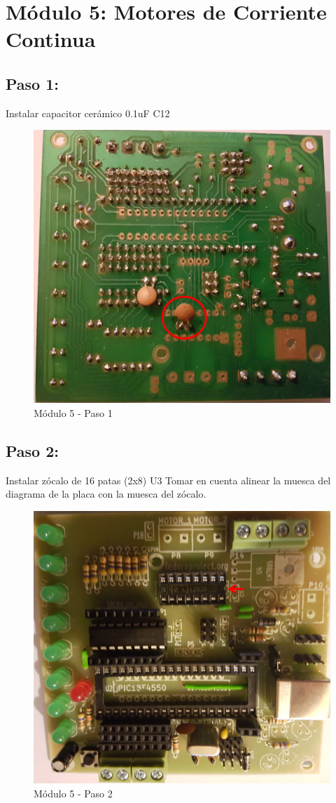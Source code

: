 \chapter{Módulo 5: Motores de Corriente Continua}

\section{Paso 1:}

Instalar capacitor cerámico 0.1uF C12

\begin{figure}[h]
	\centering
	\includegraphics[width=0.8\linewidth]{Modulo_5/M5_1}
	\caption{Módulo 5 - Paso 1}
	\label{fig:M5_1}
\end{figure}

\newpage

\section{Paso 2:}

Instalar zócalo de 16 patas (2x8) U3 Tomar en cuenta alinear la muesca del diagrama de la placa con la muesca del zócalo.

\begin{figure}[h]
	\centering
	\includegraphics[width=0.8\linewidth]{Modulo_5/M5_2}
	\caption{Módulo 5 - Paso 2}
	\label{fig:M5_2}
\end{figure}

